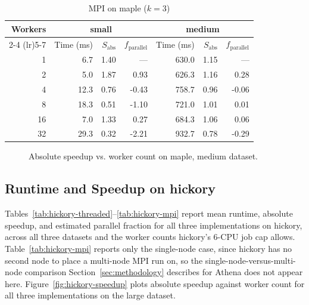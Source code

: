 \documentclass[conference]{IEEEtran}
\begin{document}
\begin{table}[t]
\caption{MPI on maple ($k=3$)}
\label{tab:maple-mpi}
\centering
\begin{tabular}{rrrrrrr}
\toprule
Workers & \multicolumn{3}{c}{small} & \multicolumn{3}{c}{medium} \\
\cmidrule(lr){2-4} \cmidrule(lr){5-7}
 & Time (ms) & $S_{\text{abs}}$ & $f_{\text{parallel}}$ & Time (ms) & $S_{\text{abs}}$ & $f_{\text{parallel}}$ \\
\midrule
1 & 6.7 & 1.40 & --- & 630.0 & 1.15 & --- \\
2 & 5.0 & 1.87 & 0.93 & 626.3 & 1.16 & 0.28 \\
4 & 12.3 & 0.76 & -0.43 & 758.7 & 0.96 & -0.06 \\
8 & 18.3 & 0.51 & -1.10 & 721.0 & 1.01 & 0.01 \\
16 & 7.0 & 1.33 & 0.27 & 684.3 & 1.06 & 0.06 \\
32 & 29.3 & 0.32 & -2.21 & 932.7 & 0.78 & -0.29 \\
\bottomrule
\end{tabular}
\end{table}

\begin{figure}[htbp]
\centering
{}
\caption{Absolute speedup vs. worker count on maple, medium dataset.}
\label{fig:maple-speedup}
\end{figure}

\subsection{Runtime and Speedup on hickory}

Tables~\ref{tab:hickory-threaded}--\ref{tab:hickory-mpi} report mean
runtime, absolute speedup, and estimated parallel fraction for all three
implementations on hickory, across all three datasets and the worker
counts hickory's 6-CPU job cap allows. Table~\ref{tab:hickory-mpi} reports
only the single-node case, since hickory has no second node to place a
multi-node MPI run on, so the single-node-versus-multi-node comparison
Section~\ref{sec:methodology} describes for Athena does not appear here.
Figure~\ref{fig:hickory-speedup} plots absolute speedup against worker
count for all three implementations on the large dataset.
\end{document}
